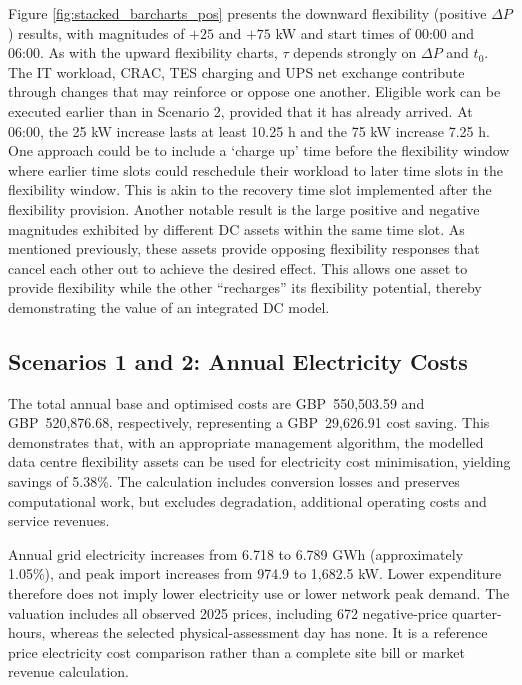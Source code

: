 \documentclass[lettersize,journal]{IEEEtran}
\begin{document}
Figure \ref{fig:stacked_barcharts_pos} presents the downward flexibility (positive $\Delta P$) results, with magnitudes of $+25$ and $+75$ kW and start times of 00:00 and 06:00. As  with the upward flexibility charts, $\tau$ depends strongly on  $\Delta P$ and $t_0$. The IT workload, CRAC, TES charging and UPS net exchange contribute through changes that may reinforce or oppose one another. Eligible work can be executed earlier than in Scenario 2, provided that it has already arrived. At 06:00, the 25 kW increase lasts at least 10.25 h and the 75 kW increase 7.25 h. One approach could be to include a `charge up' time before the flexibility window where earlier time slots could reschedule their workload to later time slots in the flexibility window. This is akin to the recovery time slot implemented after the flexibility provision. Another notable result is the large positive and negative magnitudes exhibited by different DC assets within the same time slot. As mentioned previously, these assets provide opposing flexibility responses that cancel each other out to achieve the desired effect. This allows one asset to provide flexibility while the other ``recharges'' its flexibility potential, thereby demonstrating the value of an integrated DC model.

\subsection{Scenarios 1 and 2: Annual Electricity Costs}
The total annual base and optimised costs are GBP~550,503.59 and GBP~520,876.68, respectively, representing a GBP~29,626.91 cost saving. This demonstrates that, with an appropriate management algorithm, the modelled data centre flexibility assets can be used for electricity cost minimisation, yielding savings of 5.38\%. The calculation includes conversion losses and preserves computational work, but excludes degradation, additional operating costs and service revenues.

Annual grid electricity increases from 6.718 to 6.789 GWh (approximately 1.05\%), and peak import increases from 974.9 to 1,682.5 kW. Lower expenditure therefore does not imply lower electricity use or lower network peak demand. The valuation includes all observed 2025 prices, including 672 negative-price quarter-hours, whereas the selected physical-assessment day has none. It is a reference price electricity cost comparison rather than a complete site bill or market revenue calculation.
\end{document}
